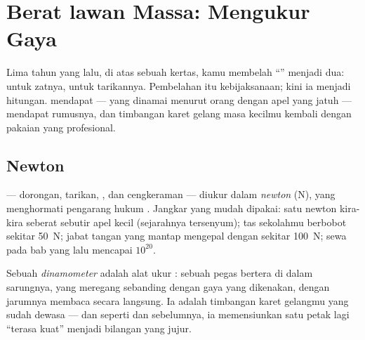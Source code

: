 \chapter{Berat lawan Massa: Mengukur Gaya}\label{ch:g9:weight-vs-mass}

Lima tahun yang lalu, di atas sebuah  kertas, kamu membelah
``'' menjadi dua:  untuk zatnya,  untuk tarikannya.
Pembelahan itu kebijaksanaan; kini ia menjadi hitungan.  mendapat
 --- yang dinamai menurut orang dengan apel yang jatuh ---
 mendapat rumusnya, dan timbangan karet gelang masa kecilmu
kembali dengan pakaian yang profesional.

\section{Newton}

\begin{definition}[Newton]\label{def:g9:weight-vs-mass:newton}
 --- dorongan, tarikan, , dan cengkeraman  ---
diukur dalam \emph{newton} (\unit{N}), yang menghormati
pengarang hukum . Jangkar yang mudah dipakai: satu newton
kira-kira seberat sebutir apel kecil (sejarahnya tersenyum); tas
sekolahmu berbobot sekitar \qty{50}{N}; jabat tangan yang mantap
mengepal dengan sekitar \qty{100}{N}; sewa  pada bab yang lalu
mencapai $10^{20}$.
\end{definition}

\begin{definition}[Dinamometer]\label{def:g9:weight-vs-mass:dynamometer}
Sebuah \emph{dinamometer} adalah alat ukur :
sebuah pegas bertera di dalam sarungnya, yang meregang sebanding
dengan gaya yang dikenakan, dengan jarumnya membaca  secara
langsung. Ia adalah timbangan karet gelangmu yang sudah dewasa ---
dan seperti  dan  sebelumnya, ia memensiunkan satu
petak lagi ``terasa kuat'' menjadi bilangan yang jujur.
\end{definition}

